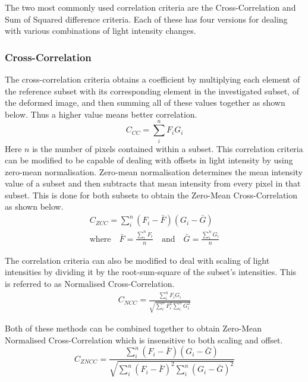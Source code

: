\documentclass[12pt,oneside,openany,a4paper, %
english, %
masters-t, goldenblock]{usthesis}
\newcommand*\mean[1]{\bar{#1}} %
\begin{document}
The two most commonly used correlation criteria are the Cross-Correlation and Sum of Squared difference criteria. Each of these has four versions for dealing with various combinations of light intensity changes.

\subsubsection{Cross-Correlation}
The cross-correlation criteria obtains a coefficient by multiplying each element of the reference subset with its corresponding element in the investigated subset, of the deformed image, and then summing all of these values together as shown below. Thus a higher value means better correlation.
\begin{equation}
  C_{CC} = \sum_{i}^n F_i G_i
\end{equation}
Here $n$ is the number of pixels contained within a subset.
This correlation criteria can be modified to be capable of dealing with offsets in light intensity by using zero-mean normalisation. Zero-mean normalisation determines the mean intensity value of a subset and then subtracts that mean intensity from every pixel in that subset. This is done for both subsets to obtain the Zero-Mean Cross-Correlation as shown below.
\begin{align}
  C_{ZCC} = \sum_i^n \left( F_i - \mean{F} \right) \left( G_i - \mean{G} \right) \\
  \text{where} \quad \mean{F} = \frac{\sum_{i}^{n} F_{i}}{n} \quad
   \text{and} \quad \mean{G} =\frac{\sum_{i}^{n} G_{i}}{n}
\end{align}

The correlation criteria can also be modified to deal with scaling of light intensities by dividing it by the root-sum-square of the subset's intensities. This is referred to as Normalised Cross-Correlation. 
\begin{align}
  C_{NCC} = \frac{\sum_i^n F_i G_i}{\sqrt{\sum_i^n F_i^2 \sum_i^n G_i^2}}
\end{align}

Both of these methods can be combined together to obtain Zero-Mean Normalised Cross-Correlation which is insensitive to both scaling and offset.
\begin{equation}
  C_{ZNCC} = \frac{\sum_i^n (F_i - \mean{F}) (G_i - \mean{G} )}{\sqrt{\sum_i^n (F_i - \mean{F})^2 \sum_i^n (G_i - \mean{G})^2}}
\end{equation}
\end{document}
